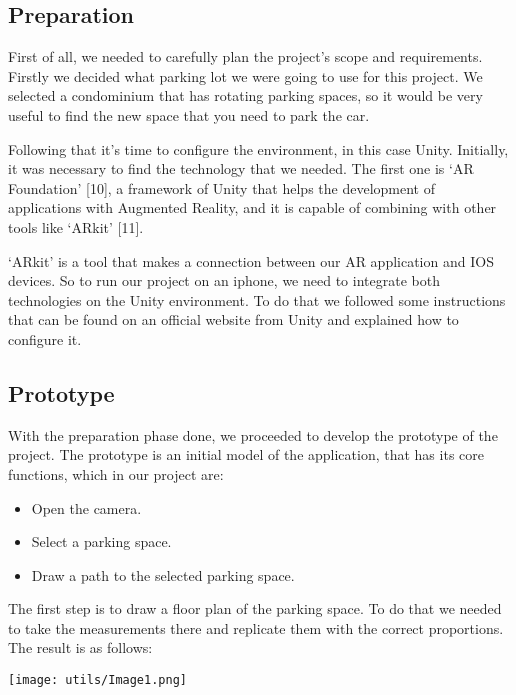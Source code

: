 \documentclass[11pt]{article}
\begin{document}
\begin{multicols}{2}
    \subsection{Preparation}
    First of all, we needed to carefully plan the project’s scope and requirements. Firstly we decided what parking lot we were going to use for this project. We selected a condominium that has rotating parking spaces, so it would be very useful to find the new space that you need to park the car. 

	Following that it's time to configure the environment, in this case Unity. Initially, it was necessary to find the technology that we needed. The first one is ‘AR Foundation’ [10], a framework of Unity that helps the development of applications with Augmented Reality, and it is capable of combining with other tools like ‘ARkit’ [11].

	‘ARkit’ is a tool that makes a connection between our AR application and IOS devices. So to run our project on an iphone, we need to integrate both technologies on the Unity environment. To do that we followed some instructions that can be found on an official website from Unity and explained how to configure it.

    \subsection{Prototype}
    With the preparation phase done, we proceeded to develop the prototype of the project. The prototype is an initial model of the application, that has its core functions, which in our project are:
    
    \begin{itemize}
		\item Open the camera.
		\item Select a parking space.
		\item Draw a path to the selected parking space.
    \end{itemize}

	The first step is to draw a floor plan of the parking space. To do that we needed to take the measurements there and replicate them with the correct proportions. The result is as follows:

    \vspace{0,5cm}
    {
	    \centering
	    \texttt{[image: utils/Image1.png]}
    }
    \vspace{0,5cm}


\end{multicols}
\end{document}
